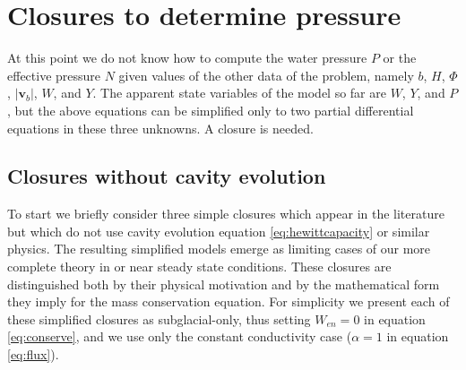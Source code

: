 \documentclass[11pt,final]{amsart}%
\newcommand\bv{\mathbf{v}}
\begin{document}
\section{Closures to determine pressure} \label{sec:closures}

At this point we do not know how to compute the water pressure $P$ or the effective pressure $N$ given values of the other data of the problem, namely $b$, $H$, $\Phi$, $|\bv_b|$, $W$, and $Y$.  The apparent state variables of the model so far are $W$, $Y$, and $P$, but the above equations can be simplified only to two partial differential equations in these three unknowns.   A closure is needed.

\subsection*{Closures without cavity evolution}  To start we briefly consider three simple closures which appear in the literature but which do not use cavity evolution equation \eqref{eq:hewittcapacity} or similar physics.  The resulting simplified models emerge as limiting cases of our more complete theory in or near steady state conditions.  These closures are distinguished both by their physical motivation and by the mathematical form they imply for the mass conservation equation.  For simplicity we present each of these simplified closures as subglacial-only, thus setting $W_{en}=0$ in equation \eqref{eq:conserve}, and we use only the constant conductivity case ($\alpha=1$ in equation \eqref{eq:flux}).
\end{document}
